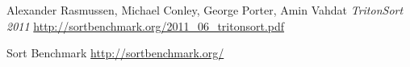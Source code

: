 \documentclass{article}
\begin{document}
\begin{thebibliography}{}

  Alexander Rasmussen, Michael Conley, George Porter, Amin Vahdat 
  \emph{TritonSort 2011}
  \url{http://sortbenchmark.org/2011_06_tritonsort.pdf}

  Sort Benchmark
  \emph{}
  \url{http://sortbenchmark.org/}
  
\end{thebibliography}{}
\end{document}

